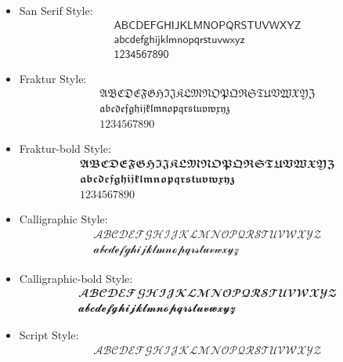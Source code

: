 \documentclass[../thesis.tex]{subfiles}
\begin{document}
\begin{itemize}
	
	\item San Serif Style: 
	\begin{gather*}
		\mathsf{
			A B C D E F G H I J K L M N O P Q R S T U V W X Y Z
		}\\
		\mathsf{
			a b c d e f g h i j k l m n o p q r s t u v w x y z
		}\\
		\mathsf{
			1 2 3 4 5 6 7 8 9 0
		}
	\end{gather*}
	
	\item Fraktur Style: 
	\begin{gather*}
		\mathfrak{
			A B C D E F G H I J K L M N O P Q R S T U V W X Y Z
		}\\
		\mathfrak{
			a b c d e f g h i j k l m n o p q r s t u v w x y z
		}\\
		\mathfrak{
			1 2 3 4 5 6 7 8 9 0
		}
	\end{gather*}
	
	\item Fraktur-bold Style: 
	\begin{gather*}
		\mathbffrak{
			A B C D E F G H I J K L M N O P Q R S T U V W X Y Z
		}\\
		\mathbffrak{
			a b c d e f g h i j k l m n o p q r s t u v w x y z
		}\\
		\mathbffrak{
			1 2 3 4 5 6 7 8 9 0
		}
	\end{gather*}
	
	\item Calligraphic Style: 
	\begin{gather*}
		\mathcal{
			A B C D E F G H I J K L M N O P Q R S T U V W X Y Z
		}\\
		\mathcal{
			a b c d e f g h i j k l m n o p q r s t u v w x y z
		}
	\end{gather*}
	
	\item Calligraphic-bold Style: 
	\begin{gather*}
		\mathbfcal{
			A B C D E F G H I J K L M N O P Q R S T U V W X Y Z
		}\\
		\mathbfcal{
			a b c d e f g h i j k l m n o p q r s t u v w x y z
		}
	\end{gather*}
	
	\item Script Style: 
	\begin{gather*}
		\mathscr{
			A B C D E F G H I J K L M N O P Q R S T U V W X Y Z
		}
	\end{gather*}
	

\end{itemize}
\end{document}
